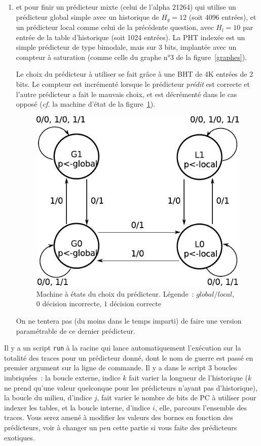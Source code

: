 \documentclass[a4paper]{article}
\begin{document}
\begin{enumerate}
\item et pour finir un prédicteur mixte (celui de l'alpha 21264) qui utilise un prédicteur global simple avec un historique de $H_g=12$ (soit 4096 entrées), et un prédicteur local comme celui de la précédente question, avec $H_l=10$ par entrée de la table d'historique (soit 1024 entrées).
      La PHT indexée est un simple prédicteur de type bimodale, mais sur 3 bits, implantée avec un compteur à saturation (comme celle du graphe n°3 de la figure~\ref{graphes}).

      Le choix du prédicteur à utiliser se fait grâce à une BHT de 4K entrées de 2 bits.
      Le compteur est incrémenté lorsque le prédicteur \emph{prédit} est correcte et l'autre prédicteur a fait le mauvais choix, et est décrémenté dans le cas opposé (\emph{cf.} la machine d'état de la figure~\ref{mixte-graphe}).
      \begin{figure}[hbt]\center\leavevmode
      \includegraphics[scale=0.7]{mixte-graphe}
      \caption{Machine à états du choix du prédicteur.
      Légende~: $global/local$, $0$ décision incorrecte, $1$ décision correcte}
      \label{mixte-graphe}
      \end{figure}

      On ne tentera pas (du moins dans le temps imparti) de faire une version paramétrable de ce dernier prédicteur.
\end{enumerate}

Il y a un script \verb+run+ à la racine qui lance automatiquement l'exécution sur la totalité des traces pour un prédicteur donné, dont le nom de guerre est passé en premier argument sur la ligne de commande.
Il y a dans le script 3 boucles imbriquées~: la boucle externe, indice $k$ fait varier la longueur de l'historique ($k$ ne prend qu'une valeur quelconque pour les prédicteurs n'ayant pas d'historique), la boucle du milieu, d'indice $j$, fait varier le nombre de bits de PC à utiliser pour indexer les tables, et la boucle interne, d'indice $i$, elle, parcours l'ensemble des traces.
Vous serez amené à modifier les valeurs des bornes en fonction des prédicteurs, voir à changer un peu cette partie si vous faite des prédicteurs exotiques.
\end{document}
